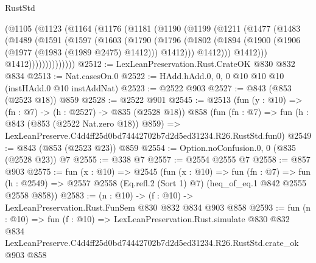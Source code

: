 \begin{lexlean}{RustStd}
\begin{coremodule}
            (@1105
              (@1123
                (@1164
                  (@1176
                    (@1181
                      (@1190
                        (@1199
                          (@1211
                            (@1477
                              (@1483
                                (@1489
                                  (@1591
                                    (@1597
                                      (@1603
                                        (@1790
                                          (@1796
                                            (@1802
                                              (@1894
                                                (@1900
                                                  (@1906 (@1977 (@1983 (@1989 @2475) @1412)))
                                                  @1412)))
                                            @1412)))
                                      @1412)))
                                @1412))))))))))))))
@2512 := LexLeanPreservation.Rust.CrateOK @830 @832 @834
@2513 := Nat.casesOn.{0}
@2522 := HAdd.hAdd.{0, 0, 0} @10 @10 @10 (instHAdd.{0} @10 instAddNat)
@2523 := @2522 @903
@2527 := @843 (@853 (@2523 @18)) @859
@2528 := @2522 @901
@2545 := @2513
    (fun (y : @10) => (fn : @7) -> (h : @2527) -> @835 (@2528 @18))
    @858
    (fun (fn : @7) =>
    fun (h : @843 (@853 (@2522 Nat.zero @18)) @859) =>
    LexLeanPreserve.C4d4ff25d0bd74442702b7d2d5ed31234.R26.RustStd.fun0)
@2549 := @843 (@853 (@2523 @23)) @859
@2554 := Option.noConfusion.{0, 0} (@835 (@2528 @23)) @7
@2555 := @338 @7
@2557 := @2554 @2555 @7
@2558 := @857 @903
@2575 := fun (x : @10) =>
  @2545
    (fun (x : @10) =>
    fun (fn : @7) =>
    fun (h : @2549) => @2557 @2558 (Eq.refl.{2} (Sort 1) @7) (heq_of_eq.{1} @842 @2555 @2558 @858))
@2583 := (n : @10) -> (f : @10) -> LexLeanPreservation.Rust.FunSem @830 @832 @834 @903 @858
@2593 := fun (n : @10) =>
  fun (f : @10) =>
  LexLeanPreservation.Rust.simulate
    @830
    @832
    @834
    LexLeanPreserve.C4d4ff25d0bd74442702b7d2d5ed31234.R26.RustStd.crate_ok
    @903
    @858
\end{coremodule}
\end{lexlean}
